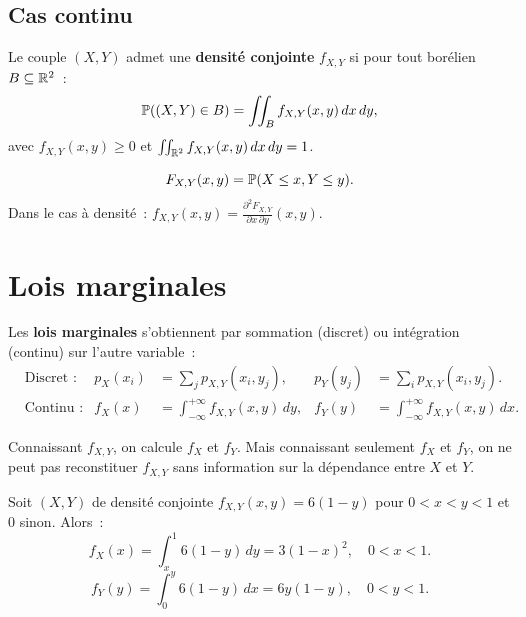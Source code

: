 \subsection{Cas continu}

\begin{definition}
Le couple $(X, Y)$ admet une \textbf{densit\'e conjointe} $f_{X,Y}$ si pour tout
bor\'elien $B \subseteq \mathbb{R}^2$~:
\[
    \mathbb{P}((X,Y) \in B) = \iint_B f_{X,Y}(x, y)\, dx\, dy,
\]
avec $f_{X,Y}(x,y) \geq 0$ et $\iint_{\mathbb{R}^2} f_{X,Y}(x,y)\, dx\, dy = 1$.
\end{definition}

\begin{definition}
\[
    F_{X,Y}(x, y) = \mathbb{P}(X \leq x, Y \leq y).
\]
Dans le cas \`a densit\'e~: $f_{X,Y}(x,y) = \frac{\partial^2 F_{X,Y}}{\partial x\, \partial y}(x,y)$.
\end{definition}

\section{Lois marginales}

\begin{definition}[Marginales]
Les \textbf{lois marginales} s'obtiennent par sommation (discret) ou int\'egration
(continu) sur l'autre variable~:
\begin{align*}
    &\text{Discret~:} & p_X(x_i) &= \sum_j p_{X,Y}(x_i, y_j), &
    p_Y(y_j) &= \sum_i p_{X,Y}(x_i, y_j). \\
    &\text{Continu~:} & f_X(x) &= \int_{-\infty}^{+\infty} f_{X,Y}(x, y)\, dy, &
    f_Y(y) &= \int_{-\infty}^{+\infty} f_{X,Y}(x, y)\, dx.
\end{align*}
\end{definition}

\begin{attention}[title=\textbf{La loi conjointe d\'etermine les marginales, mais pas l'inverse}]
Connaissant $f_{X,Y}$, on calcule $f_X$ et $f_Y$. Mais connaissant seulement
$f_X$ et $f_Y$, on ne peut pas reconstituer $f_{X,Y}$ sans information sur la
d\'ependance entre $X$ et $Y$.
\end{attention}

\begin{exemple}
Soit $(X,Y)$ de densit\'e conjointe $f_{X,Y}(x,y) = 6(1-y)$ pour
$0 < x < y < 1$ et $0$ sinon. Alors~:
\[
    f_X(x) = \int_x^1 6(1-y)\, dy = 3(1-x)^2, \quad 0 < x < 1.
\]
\[
    f_Y(y) = \int_0^y 6(1-y)\, dx = 6y(1-y), \quad 0 < y < 1.
\]
\end{exemple}

